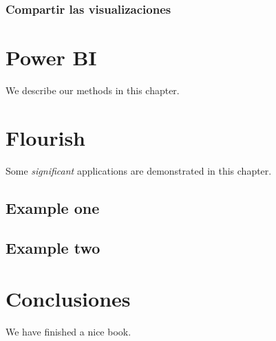 \documentclass[
]{book}
\begin{document}
\hypertarget{compartir-las-visualizaciones}{%
\subsection{Compartir las visualizaciones}\label{compartir-las-visualizaciones}}

\hypertarget{powerbi}{%
\chapter{Power BI}\label{powerbi}}

We describe our methods in this chapter.

\hypertarget{flourish}{%
\chapter{Flourish}\label{flourish}}

Some \emph{significant} applications are demonstrated in this chapter.

\hypertarget{example-one}{%
\section{Example one}\label{example-one}}

\hypertarget{example-two}{%
\section{Example two}\label{example-two}}

\hypertarget{conclu}{%
\chapter{Conclusiones}\label{conclu}}

We have finished a nice book.

  
\end{document}
